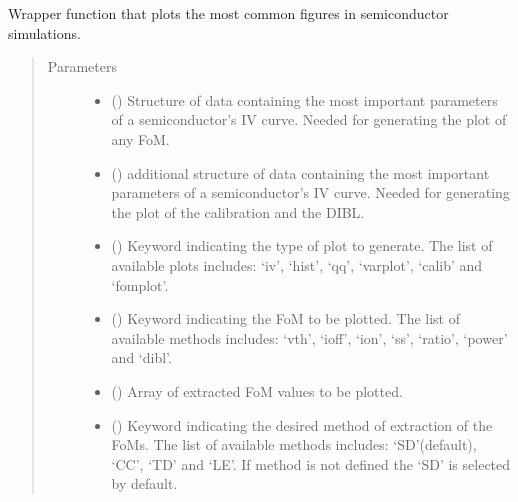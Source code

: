 \documentclass[letterpaper,10pt,english,openany, oneside]{sphinxmanual}
\begin{document}
\begin{fulllineitems}
\label{\detokenize{index:fompy.wrappers.plot}}
Wrapper function that plots the most common figures in semiconductor simulations.
\begin{quote}\begin{description}
\item[{Parameters}] \leavevmode\begin{itemize}
\item {} 
 () \textendash{} Structure of data containing the most important parameters of a semiconductor’s IV curve.
Needed for generating the plot of any FoM.

\item {} 
 () \textendash{} additional structure of data containing the most important parameters of a semiconductor’s IV curve.
Needed for generating the plot of the calibration and the DIBL.

\item {} 
 () \textendash{} Keyword indicating the type of plot to generate. The list of available plots includes:
‘iv’, ‘hist’, ‘qq’, ‘varplot’, ‘calib’ and ‘fomplot’.

\item {} 
 () \textendash{} Keyword indicating the FoM to be plotted. The list of available methods includes:
‘vth’, ‘ioff’, ‘ion’, ‘ss’, ‘ratio’, ‘power’ and ‘dibl’.

\item {} 
 () \textendash{} Array of extracted FoM values to be plotted.

\item {} 
 () \textendash{} Keyword indicating the desired method of extraction of the FoMs. The list of available methods includes:
‘SD’(default), ‘CC’, ‘TD’ and ‘LE’. If method is not defined the ‘SD’ is selected by default.


\end{itemize}
\end{description}
\end{quote}
\end{fulllineitems}
\end{document}

